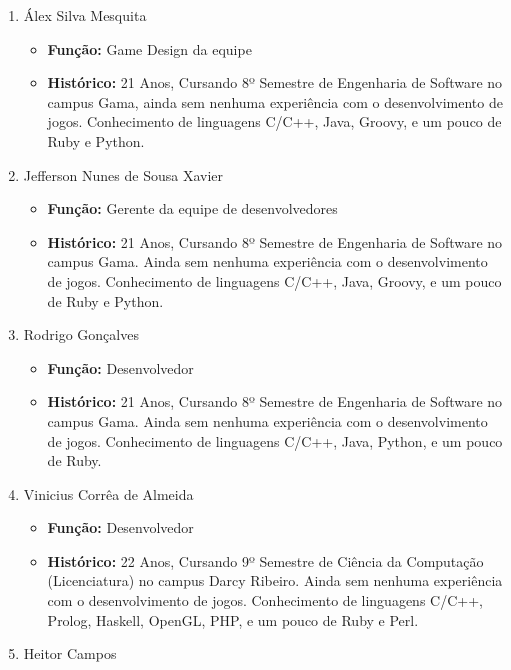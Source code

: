 \documentclass[a4paper, 11pt]{article} %
\begin{document}
\begin{enumerate}
\item Álex Silva Mesquita

\begin{itemize}
\item \textbf{Função:} Game Design da equipe
\item \textbf{Histórico:} 21 Anos, Cursando 8º Semestre de Engenharia de Software no campus Gama, ainda sem nenhuma experiência com o desenvolvimento de jogos. Conhecimento de linguagens C/C++, Java, Groovy, e um pouco de Ruby e Python.
\end{itemize}

\item Jefferson Nunes de Sousa Xavier

\begin{itemize}
\item \textbf{Função:} Gerente da equipe de desenvolvedores
\item \textbf{Histórico:} 21 Anos, Cursando 8º Semestre de Engenharia de Software no campus Gama. Ainda sem nenhuma experiência com o desenvolvimento de jogos. Conhecimento de linguagens C/C++, Java, Groovy, e um pouco de Ruby e Python.
\end{itemize}

\item Rodrigo Gonçalves

\begin{itemize}
\item \textbf{Função:} Desenvolvedor
\item \textbf{Histórico:} 21 Anos, Cursando 8º Semestre de Engenharia de Software no campus Gama. Ainda sem nenhuma experiência com o desenvolvimento de jogos. Conhecimento de linguagens C/C++, Java, Python, e um pouco de Ruby.
\end{itemize}

\item Vinicius Corrêa de Almeida

\begin{itemize}
\item \textbf{Função:} Desenvolvedor
\item \textbf{Histórico:} 22 Anos, Cursando 9º Semestre de Ciência da Computação (Licenciatura) no campus Darcy Ribeiro. Ainda sem nenhuma experiência com o desenvolvimento de jogos. Conhecimento de linguagens C/C++, Prolog, Haskell, OpenGL, PHP, e um pouco de Ruby e Perl.
\end{itemize}

\item Heitor Campos


\end{enumerate}
\end{document}
